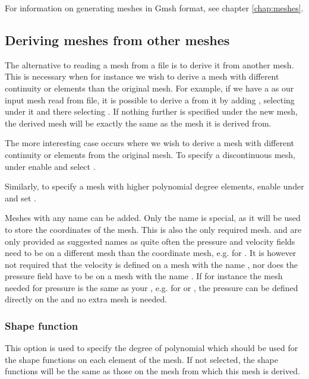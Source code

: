 For information on generating meshes in Gmsh format, see chapter
\ref{chap:meshes}. 

\subsection{Deriving meshes from other meshes}
The alternative to reading a mesh from a file is to derive it from another
mesh. This is necessary when for instance we wish to derive a mesh with
different continuity or elements than the original mesh. 
For example, if we have a  as our input mesh read 
from file, it is possible to derive a  from it
by adding , selecting 
 under it and there selecting
. If nothing further is specified 
under the new mesh, the derived mesh will be exactly the same as the mesh
it is derived from.

The more interesting case occurs where we wish to derive a mesh with
different continuity or elements from the original mesh. To specify a
discontinuous mesh, under  enable
 and select .

Similarly, to specify a mesh with higher polynomial degree elements, enable
 under  and set
.

Meshes with any name can be added. Only the name  
is special, as it will be used to store the coordinates of the mesh. This 
is also the only required mesh.  and 
are only provided as suggested names as quite often the pressure 
and velocity fields need to be on a different mesh 
than the coordinate mesh, e.g. for \PoDGPt. It is however 
not required that the velocity is defined on a mesh with the name
, nor does the pressure field have to be on a mesh
with the name . If for instance the mesh needed 
for pressure is the same as your , e.g. 
for \Poo or \Pzero\Pone, the pressure can be defined directly on
the  and no extra mesh is needed.

\subsubsection{Shape function}

This option is used to specify the degree of polynomial which should be used
for the shape functions on each element of the mesh. If not selected, the
shape functions will be the same as those on the mesh from which this mesh
is derived.

